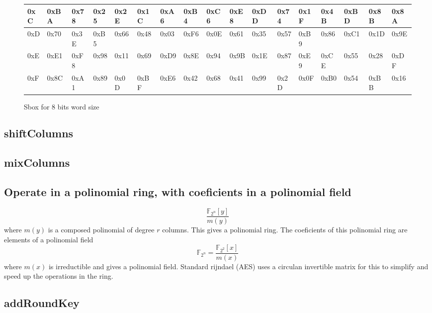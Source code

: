 \documentclass[a4paper,twoside]{llncs}
\newcommand{\Fpn}[2]{\ensuremath{\mathbb{F}_{#1^#2}}}
\newcommand{\Fpnm}[2]{\ensuremath{\frac{\Fpn{2}{#1}[#2]}{m(#2)}}}
\begin{document}
\begin{figure}[h]
{\begin{center}
\begin{tabular}[]{|l||l|l|l|l|l|l|l|l|l|l|l|l|l|l|l|l|}
0xC & 0xBA & 0x78 & 0x25 & 0x2E & 0x1C & 0xA6 & 0xB4 & 0xC6 & 0xE8 & 0xDD & 0x74 & 0x1F & 0x4B & 0xBD & 0x8B & 0x8A \\\hline
0xD & 0x70 & 0x3E & 0xB5 & 0x66 & 0x48 & 0x03 & 0xF6 & 0x0E & 0x61 & 0x35 & 0x57 & 0xB9 & 0x86 & 0xC1 & 0x1D & 0x9E \\\hline
0xE & 0xE1 & 0xF8 & 0x98 & 0x11 & 0x69 & 0xD9 & 0x8E & 0x94 & 0x9B & 0x1E & 0x87 & 0xE9 & 0xCE & 0x55 & 0x28 & 0xDF \\\hline
0xF & 0x8C & 0xA1 & 0x89 & 0x0D & 0xBF & 0xE6 & 0x42 & 0x68 & 0x41 & 0x99 & 0x2D & 0x0F & 0xB0 & 0x54 & 0xBB & 0x16 \\\hline
\end{tabular}
\end{center}}
\caption{Sbox for 8 bits word size}
\label{tab:sbox8}
\end{figure}


\subsection{shiftColumns}

\subsection{mixColumns}
\subsection{Operate in a polinomial ring, with coeficients in a polinomial field}
$$\Fpnm{n}{y}\label{eq:polinomialRing}$$ where $m(y)$ is a composed polinomial of degree $r$ columns. This gives a polinomial ring. The coeficients of this polinomial ring are elements of a polinomial field $$\Fpn{2}{n}=\Fpnm{2}{x}\label{eq:polinomialField}$$ where $m(x)$ is irreductible and gives a polinomial field.
Standard rijndael (AES) uses a circulan invertible matrix for this to simplify and speed up the operations in the ring.

\subsection{addRoundKey}
\end{document}
